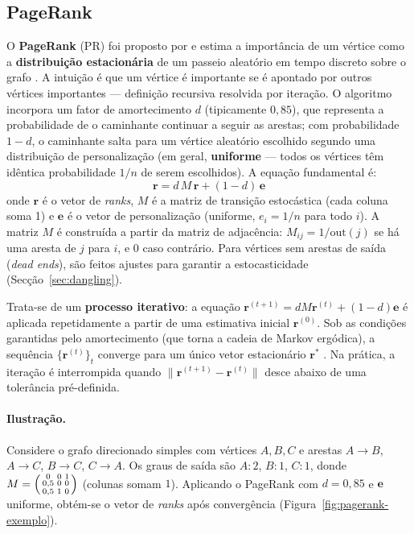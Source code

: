 \subsection{PageRank}
\label{sec:pagerank}

O \textbf{PageRank} (PR) foi proposto por \citet{page1999} e estima a
importância de um vértice como a \textbf{distribuição estacionária}
de um passeio aleatório em tempo discreto sobre o grafo
\parencite{brin1998, masuda2017}. A intuição é que um vértice é
importante se é apontado por outros vértices importantes ---
definição recursiva resolvida por iteração. O algoritmo incorpora um
fator de amortecimento $d$ (tipicamente $0{,}85$), que representa a
probabilidade de o caminhante continuar a seguir as arestas; com
probabilidade $1 - d$, o caminhante salta para um vértice aleatório
escolhido segundo uma distribuição de personalização (em geral,
\textbf{uniforme} --- todos os vértices têm idêntica probabilidade
$1/n$ de serem escolhidos). A equação fundamental é:
\begin{equation}
    \mathbf{r} = d\, M\, \mathbf{r} + (1 - d)\, \mathbf{e}
    \label{eq:pagerank}
\end{equation}
onde $\mathbf{r}$ é o vetor de \emph{ranks}, $M$ é a matriz de
transição estocástica (cada coluna soma 1) e $\mathbf{e}$ é o vetor
de personalização (uniforme, $e_i = 1/n$ para todo $i$). A matriz $M$
é construída a partir da matriz de adjacência: $M_{ij} = 1/\text{out}(j)$
se há uma aresta de $j$ para $i$, e $0$ caso contrário. Para vértices
sem arestas de saída (\emph{dead ends}), são feitos ajustes para
garantir a estocasticidade (Secção~\ref{sec:dangling}).

Trata-se de um \textbf{processo iterativo}: a equação
$\mathbf{r}^{(t+1)} = d M \mathbf{r}^{(t)} + (1-d)\mathbf{e}$ é
aplicada repetidamente a partir de uma estimativa inicial
$\mathbf{r}^{(0)}$. Sob as condições garantidas pelo amortecimento
(que torna a cadeia de Markov ergódica), a sequência
$\{\mathbf{r}^{(t)}\}_t$ converge para um único vetor estacionário
$\mathbf{r}^{*}$ \parencite{brin1998, masuda2017}. Na prática, a
iteração é interrompida quando
$\|\mathbf{r}^{(t+1)} - \mathbf{r}^{(t)}\|$ desce abaixo de uma
tolerância pré-definida.

\paragraph{Ilustração.} Considere o grafo direcionado simples com
vértices $A, B, C$ e arestas $A \to B$, $A \to C$, $B \to C$,
$C \to A$. Os graus de saída são $A : 2$, $B : 1$, $C : 1$, donde
\(
M =
\begin{psmallmatrix}
0 & 0 & 1 \\
0{,}5 & 0 & 0 \\
0{,}5 & 1 & 0
\end{psmallmatrix}
\)
(colunas somam $1$). Aplicando o PageRank com $d = 0{,}85$ e
$\mathbf{e}$ uniforme, obtém-se o vetor de \emph{ranks} após
convergência (Figura~\ref{fig:pagerank-exemplo}).

